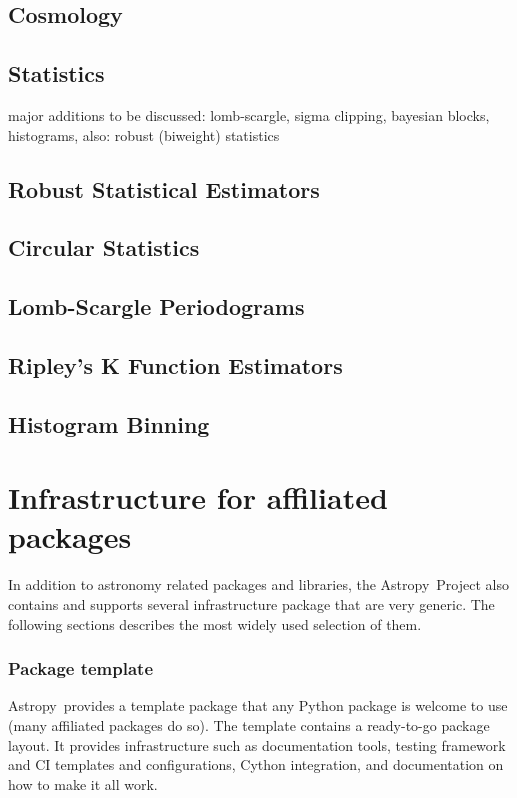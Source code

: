 \documentclass[modern]{aastex61}
\newcommand{\astropy}{Astropy}
\begin{document}

\subsection{Cosmology}


\subsection{Statistics}
major additions to be discussed: lomb-scargle, sigma clipping, bayesian blocks, histograms, also:  robust (biweight) statistics

\subsection{Robust Statistical Estimators}
\subsection{Circular Statistics}
\subsection{Lomb-Scargle Periodograms}
\subsection{Ripley's K Function Estimators}
\subsection{Histogram Binning}

\section{Infrastructure for affiliated packages}
\label{sec:infrastructure}
%
\par In addition to astronomy related packages and libraries, the \astropy\
Project also contains and supports several infrastructure package that are
very generic. The following sections describes the most widely used
selection of them.
%
\subsubsection{Package template}
\par \astropy\ provides a template package that any Python package is welcome to
use (many affiliated packages do so). The template contains a ready-to-go
package layout. It provides infrastructure such as documentation tools,
testing framework and CI templates and configurations, Cython integration,
and documentation on how to make it all work.
%
\end{document}
